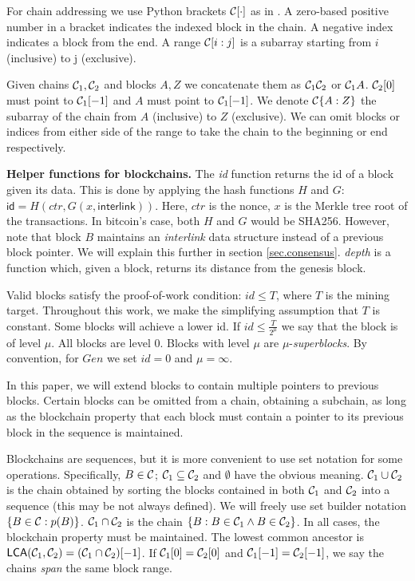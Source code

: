 For chain addressing we use Python brackets $\mathcal{C}[\cdot]$ as in
\cite{fruitchains}. A zero-based positive number in a bracket indicates the
indexed block in the chain. A negative index indicates a block from the end. A
range $\mathcal{C}[i:j]$ is a subarray starting from $i$ (inclusive) to j
(exclusive).

Given chains $\mathcal{C}_1, \mathcal{C}_2$ and blocks $A, Z$ we concatenate them as
$\mathcal{C}_1 \mathcal{C}_2$ or $\mathcal{C}_1 A$. $\mathcal{C}_2[0]$ must point to $\mathcal{C}_1[-1]$
and $A$ must point to $\mathcal{C}_1[-1]$. We denote $\mathcal{C}\{A:Z\}$ the subarray of
the chain from $A$ (inclusive) to $Z$ (exclusive). We can omit blocks or indices
from either side of the range to take the chain to the beginning or end
respectively.

\textbf{Helper functions for blockchains.} The \textit{id} function returns the
id of a block given its data. This is done by applying the hash functions $H$
and $G$: $\textsf{id} = H(ctr, G(x, \textsf{interlink}))$. Here, $ctr$ is the
nonce, $x$ is the Merkle tree root of the transactions. In bitcoin's case, both
$H$ and $G$ would be SHA256.
However, note
that block $B$ maintains an \textit{interlink} data structure instead of a
previous block pointer. We will explain this further in section
\ref{sec.consensus}. \textit{depth} is a function which, given a block, returns
its distance from the genesis block.

Valid blocks satisfy the proof-of-work condition: $id \leq T$, where $T$ is the
mining target. Throughout this work, we make the simplifying assumption that $T$
is constant. Some blocks will achieve a lower id. If $id \leq \frac{T}{2^\mu}$
we say that the block is of level $\mu$. All blocks are level $0$. Blocks with
level $\mu$ are $\mu$-\textit{superblocks}.
By convention, for $Gen$ we set $id = 0$ and $\mu = \infty$.

In this paper, we will extend blocks to contain multiple pointers to previous
blocks. Certain blocks can be omitted from a chain, obtaining a subchain, as
long as the blockchain property that each block must contain a pointer to its
previous block in the sequence is maintained.

Blockchains are sequences, but it is more convenient to use set notation for
some operations. Specifically, $B \in \mathcal{C}$; $\mathcal{C}_1 \subseteq \mathcal{C}_2$ and
$\emptyset$ have the obvious meaning. $\mathcal{C}_1 \cup \mathcal{C}_2$ is the chain
obtained by sorting the blocks contained in both $\mathcal{C}_1$ and $\mathcal{C}_2$ into
a sequence (this may be not always defined).
We will freely use set builder notation $\{B \in \mathcal{C}: p(B)\}$.
$\mathcal{C}_1 \cap \mathcal{C}_2$ is the
chain $\{B: B \in \mathcal{C}_1 \land B \in \mathcal{C}_2\}$. In all cases, the
blockchain property must be maintained. The lowest common ancestor is
$\textsf{LCA}(\mathcal{C}_1,
\mathcal{C}_2) = (\mathcal{C}_1 \cap \mathcal{C}_2)[-1]$.
If $\mathcal{C}_1[0] = \mathcal{C}_2[0]$ and
$\mathcal{C}_1[-1] = \mathcal{C}_2[-1]$, we say the chains \textit{span} the same
block range.

